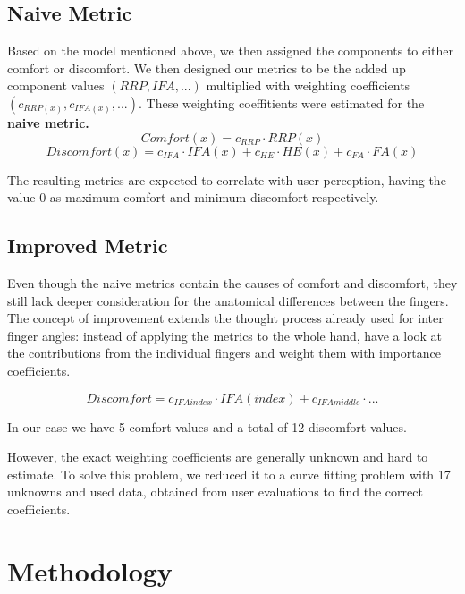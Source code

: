 \documentclass{sig-alternate-05-2015}
\begin{document}
\subsection{Naive Metric}


Based on the model mentioned above\cite{vink2012editorial}, we then assigned the components to either comfort or discomfort. We then designed our metrics to be the added up component values \begin{math}(RRP, IFA, ...)\end{math} multiplied with weighting coefficients \begin{math}(c_{RRP(x)}, c_{IFA(x)}, ...)\end{math}. These weighting coeffitients were estimated for the \textbf{naive metric.} 
	\[
	Comfort(x) = c_{RRP}\cdot RRP(x)
	\]
	\[
	Discomfort(x) = c_{IFA}\cdot IFA(x)  +  c_{HE}\cdot HE(x)  +  c_{FA}\cdot FA(x)
	\]

The resulting metrics are expected to correlate with user perception, having the value 0 as maximum comfort and minimum discomfort respectively.


\subsection{Improved Metric}

Even though the naive metrics contain the causes of comfort and discomfort, they still lack deeper consideration for the anatomical differences between the fingers.
The concept of improvement extends the thought process already used for inter finger angles: instead of applying the metrics to the whole hand, have a look at the contributions from the individual fingers and weight them with importance coefficients. 

	\[
	Discomfort = c_{IFAindex}\cdot IFA(index)  +  c_{IFAmiddle}\cdot...
	\]

In our case we have 5 comfort values and a total of 12 discomfort values. 

However, the exact weighting coefficients are generally unknown and hard to estimate. To solve this problem, we reduced it to a curve fitting problem with 17 unknowns and used data, obtained from user evaluations to find the correct coefficients.

\section{Methodology}
\end{document}
